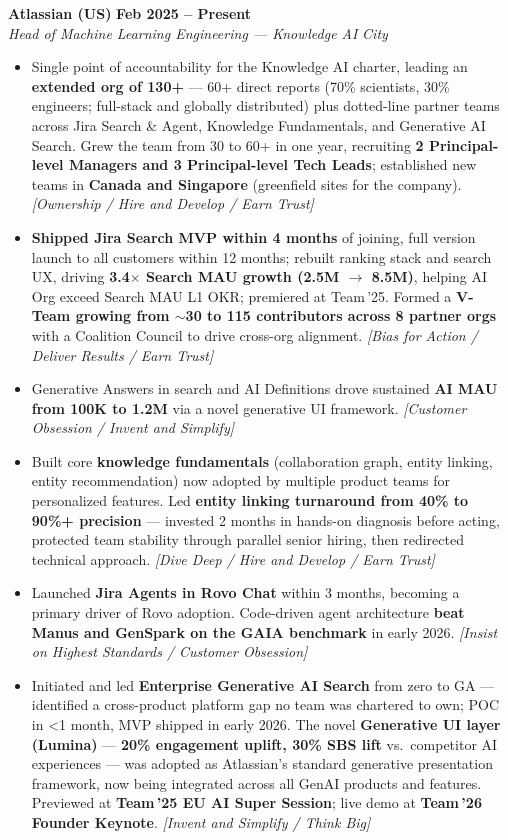 \documentclass[10.5pt,letterpaper]{article}
\newcommand{\role}[4]{%
  \noindent\textbf{#1} \hfill \textbf{#3}\\
  \textit{#2} \hfill \textit{#4}\par\vspace{2pt}}
\newcommand{\lp}[1]{\textcolor{blue!55!black}{\small\textit{[#1]}}}
\begin{document}
\role{Atlassian (US)}{Head of Machine Learning Engineering --- Knowledge AI}{Feb 2025 -- Present}{{{City}}}
\begin{itemize}
  \item Single point of accountability for the Knowledge AI charter, leading an \textbf{extended org of 130+} — 60+ direct reports (70\% scientists, 30\% engineers; full-stack and globally distributed) plus dotted-line partner teams across Jira Search \& Agent, Knowledge Fundamentals, and Generative AI Search. Grew the team from 30 to 60+ in one year, recruiting \textbf{2 Principal-level Managers and 3 Principal-level Tech Leads}; established new teams in \textbf{Canada and Singapore} (greenfield sites for the company). \lp{Ownership / Hire and Develop / Earn Trust}
  \item \textbf{Shipped Jira Search MVP within 4 months} of joining, full version launch to all customers within 12 months; rebuilt ranking stack and search UX, driving \textbf{3.4$\times$ Search MAU growth (2.5M $\to$ 8.5M)}, helping AI Org exceed Search MAU L1 OKR; premiered at Team\,'25. Formed a \textbf{V-Team growing from $\sim$30 to 115 contributors across 8 partner orgs} with a Coalition Council to drive cross-org alignment. \lp{Bias for Action / Deliver Results / Earn Trust}
  \item Generative Answers in search and AI Definitions drove sustained \textbf{AI MAU from 100K to 1.2M} via a novel generative UI framework. \lp{Customer Obsession / Invent and Simplify}
  \item Built core \textbf{knowledge fundamentals} (collaboration graph, entity linking, entity recommendation) now adopted by multiple product teams for personalized features. Led \textbf{entity linking turnaround from 40\% to 90\%+ precision} — invested 2 months in hands-on diagnosis before acting, protected team stability through parallel senior hiring, then redirected technical approach. \lp{Dive Deep / Hire and Develop / Earn Trust}
  \item Launched \textbf{Jira Agents in Rovo Chat} within 3 months, becoming a primary driver of Rovo adoption. Code-driven agent architecture \textbf{beat Manus and GenSpark on the GAIA benchmark} in early 2026. \lp{Insist on Highest Standards / Customer Obsession}
  \item Initiated and led \textbf{Enterprise Generative AI Search} from zero to GA — identified a cross-product platform gap no team was chartered to own; POC in <1 month, MVP shipped in early 2026. The novel \textbf{Generative UI layer (Lumina)} — \textbf{20\% engagement uplift, 30\% SBS lift} vs.\ competitor AI experiences — was adopted as Atlassian's standard generative presentation framework, now being integrated across all GenAI products and features. Previewed at \textbf{Team\,'25 EU AI Super Session}; live demo at \textbf{Team\,'26 Founder Keynote}. \lp{Invent and Simplify / Think Big}
\end{itemize}
\end{document}
